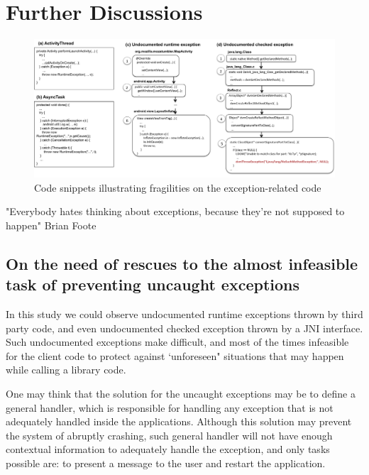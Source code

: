 \documentclass[conference]{IEEEtran}
\begin{document}
\noindent {}


\section{Further Discussions}
\label{sec:disc}

\begin{figure} \centering \includegraphics[scale=0.55]{examples_new2.png}
\caption{Code snippets illustrating fragilities on the exception-related code} \label{fig:snippets} \end{figure}

 "Everybody hates thinking about exceptions, because they’re not supposed to happen"
  Brian Foote


\subsection{On the need of rescues to the almost infeasible task of preventing uncaught exceptions}
In this study we could observe undocumented runtime exceptions thrown by third party code,
and even undocumented checked exception thrown by a JNI interface.
Such undocumented exceptions make difficult, and most of the times infeasible
for the client code to protect against `unforeseen" situations that may happen 
while calling a library code.

One may think that the solution for the uncaught exceptions may be to define a general handler, 
which is responsible for handling any exception that is not
adequately handled inside the applications. Although this 
solution may prevent  the system of abruptly crashing,
 such general handler will not have enough
contextual information to adequately handle the exception, 
and only tasks possible are: to present a message to the user
 and restart the application.
\end{document}
